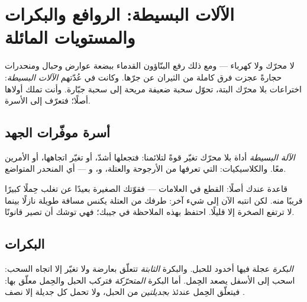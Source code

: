 \chapter{الآلات البسيطة: الروافع والبكرات والمستويات المائلة}\label{ch:g5:simple-machines}

لا محرّك ولا كهرباء --- ومع ذلك رفع البنّاؤون القدماء ببضعة
عوارض وحبال ومنحدرات حجارةً عجزت فرق كاملة من الثيران عن جرّها.
وكانت في عُدّتهم \emph{الآلات البسيطة}: اختراعات بلا محرّك البتة،
تحوّل سحبة ضعيفة مريحة إلى سحبة جبّارة. وأنت تملك أولاها أصلًا؛
فتعرّف إلى الأسرة.

\section{أسرة موفّرات الجهد}

\begin{definition}\label{def:g5:simple-machines:machine}
\emph{الآلة البسيطة} أداة بلا محرّك تغيّر قوةً
لتلائمنا: فتجعلها أشدّ، أو تغيّر اتجاهها، أو الأمرين معًا.
والكلاسيكيات: \emph{} التي تعرفها من الأرجوحة والعتلة،
و\emph{}، و\emph{} --- أي المنحدر
المتواضع.
\end{definition}

\begin{example}\label{ex:g5:simple-machines:lever}
قاعدة  عندك أصلًا: القطع في العلامات --- فقوّتك الصغيرة
بعيدًا عن  تغلب حِملًا كبيرًا قريبًا منه. لكن
انتبه الآن إلى شيء آخر: طرفك من العتلة يكنس مسافة طويلة نازلًا
بينما لا ترتفع الصخرة إلا قليلًا. احتفظ بهذه الملاحظة في جيبك؛
فهي توشك أن تصير قانونًا.
\end{example}

\section{البكرات}

\begin{definition}[البكرة]\label{def:g5:simple-machines:pulley}
\emph{البكرة} عجلة فيها أخدود للحبل. والبكرة
\emph{الثابتة} تتعلّق بعارضة ولا تغيّر إلا اتجاه السحب: اسحب إلى
الأسفل يصعد الحِمل. أما البكرة \emph{المتحرّكة} فتركب الحبل
والحِمل معلّق بها: فيتعلّق الحِمل عندئذ \emph{بجديلتين} من
الحبل، ولا تحمل كل جديلة إلا نصف .
\end{definition}

